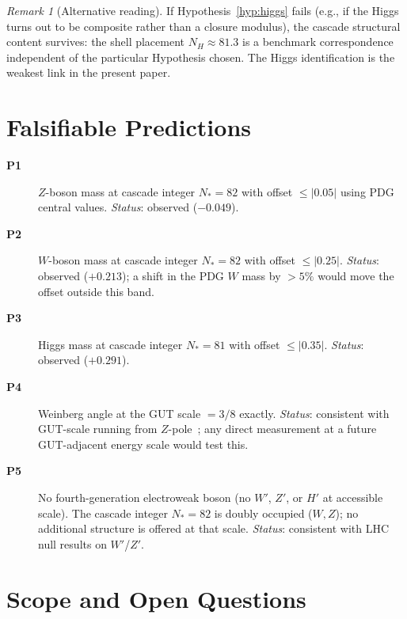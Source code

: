 \documentclass[12pt]{article}
\theoremstyle{definition}
\theoremstyle{remark}
\newtheorem{remark}[theorem]{Remark}
\begin{document}
\begin{remark}[Alternative reading]
If Hypothesis~\ref{hyp:higgs} fails (e.g., if the Higgs turns out to be composite rather than a closure modulus), the cascade structural content survives: the shell placement $N_H \approx 81.3$ is a benchmark correspondence independent of the particular Hypothesis chosen. The Higgs identification is the weakest link in the present paper.
\end{remark}

\section{Falsifiable Predictions}\label{sec:predictions}

\begin{description}
\item[\textbf{P1}] $Z$-boson mass at cascade integer $N_* = 82$ with offset $\le |0.05|$ using PDG central values. \emph{Status}: observed ($-0.049$).
\item[\textbf{P2}] $W$-boson mass at cascade integer $N_* = 82$ with offset $\le |0.25|$. \emph{Status}: observed ($+0.213$); a shift in the PDG $W$ mass by $> 5\%$ would move the offset outside this band.
\item[\textbf{P3}] Higgs mass at cascade integer $N_* = 81$ with offset $\le |0.35|$. \emph{Status}: observed ($+0.291$).
\item[\textbf{P4}] Weinberg angle at the GUT scale $= 3/8$ exactly. \emph{Status}: consistent with GUT-scale running from $Z$-pole~\citep{SmartXXII}; any direct measurement at a future GUT-adjacent energy scale would test this.
\item[\textbf{P5}] No fourth-generation electroweak boson (no $W'$, $Z'$, or $H'$ at accessible scale). The cascade integer $N_* = 82$ is doubly occupied ($W, Z$); no additional structure is offered at that scale. \emph{Status}: consistent with LHC null results on $W'$/$Z'$.
\end{description}

\section{Scope and Open Questions}\label{sec:scope}
\end{document}
